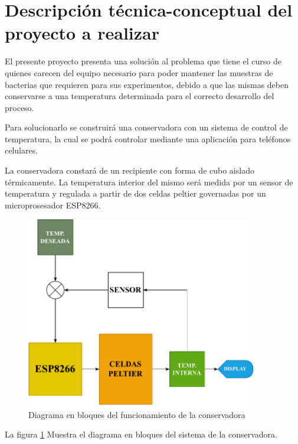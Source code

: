 \section{Descripción técnica-conceptual del proyecto a realizar}
\label{sec:descripcion}

\quad El presente proyecto presenta una solución al problema que tiene el curso de \empclientename\hspace{1px} quienes carecen del equipo necesario para poder mantener las muestras de bacterias que requieren para sus experimentos, debido a que las mismas deben conservarse a una temperatura determinada para el correcto desarrollo del proceso.

\quad Para solucionarlo se construirá una conservadora con un sistema de control de temperatura, la cual se podrá controlar mediante una aplicación para teléfonos celulares.

\quad La conservadora constará de un recipiente con forma de cubo aislado térmicamente. La temperatura interior del mismo será medida por un sensor de temperatura y regulada a partir de dos celdas peltier governadas por un microprosesador ESP8266.
\newline
\begin{figure}[h]
  \centering
  \includegraphics[width=0.9\textwidth]{./Figuras/diagrama.pdf}
  \caption{Diagrama en bloques del funcionamiento de la conservadora}
  \label{fig:diagrama}
\end{figure}
\quad La figura \ref{fig:diagrama} Muestra el diagrama en bloques del sistema de la conservadora.
\pagebreak